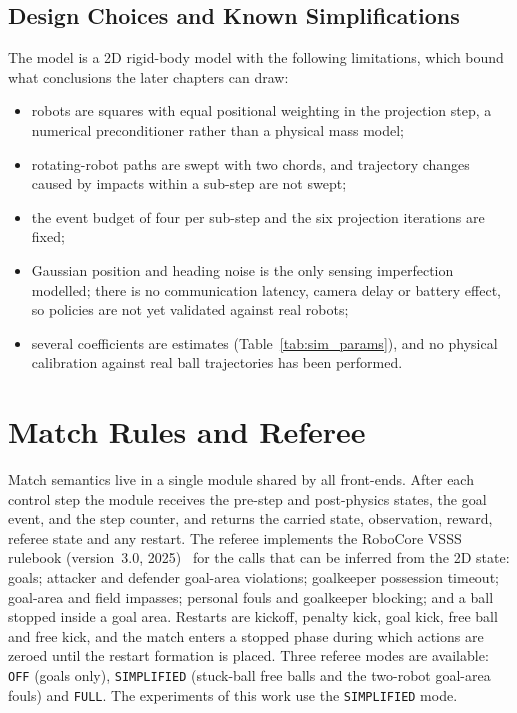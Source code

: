 

\subsection{Design Choices and Known Simplifications}

The model is a 2D rigid-body model with the following limitations, which
bound what conclusions the later chapters can draw:
\begin{itemize}
  \item robots are squares with equal positional weighting in the projection step, a numerical
        preconditioner rather than a physical mass model;
  \item rotating-robot paths are swept with two chords, and trajectory changes caused by
        impacts within a sub-step are not swept;
  \item the event budget of four per sub-step and the six projection iterations are fixed;
  \item Gaussian position and heading noise is the only sensing imperfection modelled; there is no communication latency, camera delay or battery effect, so
        policies are not yet validated against real robots;
  \item several coefficients are estimates (Table~\ref{tab:sim_params}), and no physical
        calibration against real ball trajectories has been performed.
\end{itemize}

\section{Match Rules and Referee}
\label{sec:sim_rules}

Match semantics live in a single module shared by all front-ends.  After each control step the
module receives the pre-step and post-physics states, the goal event, and the step counter, and
returns the carried state, observation, reward, referee state and any restart.  The referee
implements the RoboCore VSSS rulebook (version~3.0, 2025)~\cite{robocore_vsss_rules} for the
calls that can be inferred from the 2D state: goals; attacker and defender goal-area violations;
goalkeeper possession timeout; goal-area and field impasses; personal fouls and goalkeeper
blocking; and a ball stopped inside a goal area.  Restarts are kickoff, penalty kick, goal kick,
free ball and free kick, and the match enters a stopped phase during which actions are zeroed
until the restart formation is placed.  Three referee modes are available:
\texttt{OFF} (goals only), \texttt{SIMPLIFIED} (stuck-ball free balls and the two-robot goal-area
fouls) and \texttt{FULL}.  The experiments of this work use the \texttt{SIMPLIFIED} mode.

